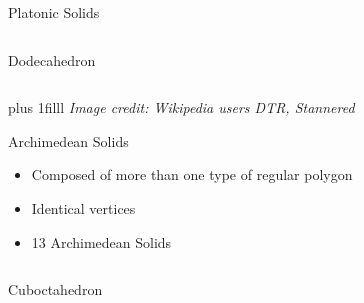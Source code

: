 \documentclass{beamer}
\newcommand{\btVFill}{\vskip0pt plus 1filll}
\begin{document}
\begin{frame}{Platonic Solids}
\begin{columns}
\begin{column}{0.32\textwidth}
      Dodecahedron
     \end{column}
\end{columns}
\btVFill
\textit{\scriptsize Image credit: Wikipedia users DTR, Stannered}
\end{frame}
\begin{frame}{Archimedean Solids}
\begin{itemize}
  \item Composed of more than one type of regular polygon
  \item Identical vertices
  \item 13 Archimedean Solids
\end{itemize}
\vspace{0.1 in}
\begin{columns}
    \begin{column}{0.32\textwidth}
      \centering
      

      Cuboctahedron
     \end{column}
    \begin{column}{0.32\textwidth}
      \centering


\end{column}
\end{columns}
\end{frame}
\end{document}
